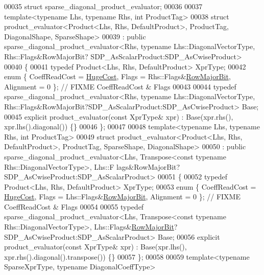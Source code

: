 \begin{DoxyCode}
00035 \textcolor{keyword}{struct }sparse\_diagonal\_product\_evaluator;
00036 
00037 \textcolor{keyword}{template}<\textcolor{keyword}{typename} Lhs, \textcolor{keyword}{typename} Rhs, \textcolor{keywordtype}{int} ProductTag>
00038 \textcolor{keyword}{struct }product\_evaluator<Product<Lhs, Rhs, DefaultProduct>, ProductTag, DiagonalShape, SparseShape>
00039   : \textcolor{keyword}{public} sparse\_diagonal\_product\_evaluator<Rhs, typename Lhs::DiagonalVectorType, Rhs::Flags&RowMajorBit?
      SDP\_AsScalarProduct:SDP\_AsCwiseProduct>
00040 \{
00041   \textcolor{keyword}{typedef} Product<Lhs, Rhs, DefaultProduct> XprType;
00042   \textcolor{keyword}{enum} \{ CoeffReadCost = \hyperlink{namespace_eigen_a3163430a1c13173faffde69016b48aaf}{HugeCost}, Flags = Rhs::Flags&\hyperlink{group__flags_gae4f56c2a60bbe4bd2e44c5b19cbe8762}{RowMajorBit}, Alignment = 0 \}; \textcolor{comment}{//
       FIXME CoeffReadCost & Flags}
00043   
00044   \textcolor{keyword}{typedef} sparse\_diagonal\_product\_evaluator<Rhs, typename Lhs::DiagonalVectorType,
       Rhs::Flags&RowMajorBit?SDP\_AsScalarProduct:SDP\_AsCwiseProduct> Base;
00045   \textcolor{keyword}{explicit} product\_evaluator(\textcolor{keyword}{const} XprType& xpr) : Base(xpr.rhs(), xpr.lhs().diagonal()) \{\}
00046 \};
00047 
00048 \textcolor{keyword}{template}<\textcolor{keyword}{typename} Lhs, \textcolor{keyword}{typename} Rhs, \textcolor{keywordtype}{int} ProductTag>
00049 \textcolor{keyword}{struct }product\_evaluator<Product<Lhs, Rhs, DefaultProduct>, ProductTag, SparseShape, DiagonalShape>
00050   : \textcolor{keyword}{public} sparse\_diagonal\_product\_evaluator<Lhs, Transpose<const typename Rhs::DiagonalVectorType>, Lhs::F
      lags&RowMajorBit?SDP\_AsCwiseProduct:SDP\_AsScalarProduct>
00051 \{
00052   \textcolor{keyword}{typedef} Product<Lhs, Rhs, DefaultProduct> XprType;
00053   \textcolor{keyword}{enum} \{ CoeffReadCost = \hyperlink{namespace_eigen_a3163430a1c13173faffde69016b48aaf}{HugeCost}, Flags = Lhs::Flags&\hyperlink{group__flags_gae4f56c2a60bbe4bd2e44c5b19cbe8762}{RowMajorBit}, Alignment = 0 \}; \textcolor{comment}{//
       FIXME CoeffReadCost & Flags}
00054   
00055   \textcolor{keyword}{typedef} sparse\_diagonal\_product\_evaluator<Lhs, Transpose<const typename Rhs::DiagonalVectorType>, 
      Lhs::Flags&\hyperlink{group__flags_gae4f56c2a60bbe4bd2e44c5b19cbe8762}{RowMajorBit}?SDP\_AsCwiseProduct:SDP\_AsScalarProduct> Base;
00056   \textcolor{keyword}{explicit} product\_evaluator(\textcolor{keyword}{const} XprType& xpr) : Base(xpr.lhs(), xpr.rhs().diagonal().transpose()) \{\}
00057 \};
00058 
00059 \textcolor{keyword}{template}<\textcolor{keyword}{typename} SparseXprType, \textcolor{keyword}{typename} DiagonalCoeffType>

\end{DoxyCode}
